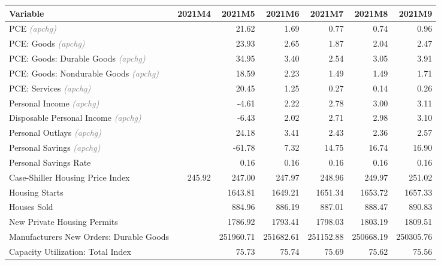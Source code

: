 \documentclass[11pt, letterpaper]{article}\usepackage[]{graphicx}\usepackage[]{color}
\begin{document}
\begin{table}[H]
\centering
\begingroup\fontsize{10pt}{12pt}\selectfont
\begin{tabular}{lrrrrrr}
  \hline
Variable & 2021M4 & 2021M5 & 2021M6 & 2021M7 & 2021M8 & 2021M9 \\ 
  \hline
PCE \textit{\footnotesize\textcolor{gray}{(apchg)}} &  & 21.62 & 1.69 & 0.77 & 0.74 & 0.96 \\ 
  PCE: Goods \textit{\footnotesize\textcolor{gray}{(apchg)}} &  & 23.93 & 2.65 & 1.87 & 2.04 & 2.47 \\ 
  PCE: Goods: Durable Goods \textit{\footnotesize\textcolor{gray}{(apchg)}} &  & 34.95 & 3.40 & 2.54 & 3.05 & 3.91 \\ 
  PCE: Goods: Nondurable Goods \textit{\footnotesize\textcolor{gray}{(apchg)}} &  & 18.59 & 2.23 & 1.49 & 1.49 & 1.71 \\ 
  PCE: Services \textit{\footnotesize\textcolor{gray}{(apchg)}} &  & 20.45 & 1.25 & 0.27 & 0.14 & 0.26 \\ 
  Personal Income \textit{\footnotesize\textcolor{gray}{(apchg)}} &  & -4.61 & 2.22 & 2.78 & 3.00 & 3.11 \\ 
  Disposable Personal Income \textit{\footnotesize\textcolor{gray}{(apchg)}} &  & -6.43 & 2.02 & 2.71 & 2.98 & 3.10 \\ 
  Personal Outlays \textit{\footnotesize\textcolor{gray}{(apchg)}} &  & 24.18 & 3.41 & 2.43 & 2.36 & 2.57 \\ 
  Personal Savings \textit{\footnotesize\textcolor{gray}{(apchg)}} &  & -61.78 & 7.32 & 14.75 & 16.74 & 16.90 \\ 
  Personal Savings Rate &  & 0.16 & 0.16 & 0.16 & 0.16 & 0.16 \\ 
  Case-Shiller Housing Price Index & 245.92 & 247.00 & 247.97 & 248.96 & 249.97 & 251.02 \\ 
  Housing Starts &  & 1643.81 & 1649.21 & 1651.34 & 1653.72 & 1657.33 \\ 
  Houses Sold &  & 884.96 & 886.19 & 887.01 & 888.47 & 890.83 \\ 
  New Private Housing Permits &  & 1786.92 & 1793.41 & 1798.03 & 1803.19 & 1809.51 \\ 
  Manufacturers New Orders: Durable Goods &  & 251960.71 & 251682.61 & 251152.88 & 250668.19 & 250305.76 \\ 
  Capacity Utilization: Total Index &  & 75.73 & 75.74 & 75.69 & 75.62 & 75.56 \\ 

\end{tabular}
\end{table}
\end{document}
